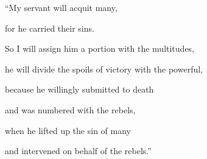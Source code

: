 {\par }{\Q “My servant
will acquit many,
\par }{\Q for he carried
their sins.
\par }{\Q {}So
I will assign
him a portion
with
the multitudes,
\par }{\Q he will divide
the spoils
of victory with the powerful,
\par }{\Q because
he willingly submitted
to death
\par }{\Q and was numbered
with
the rebels,
\par }{\Q when he
lifted up
the sin
of many
\par }{\Q and intervened on behalf
of the rebels.”

\par }
